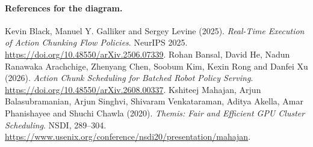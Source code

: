 \paragraph{References for the diagram.}
Kevin Black, Manuel Y. Galliker and Sergey Levine (2025). \emph{Real-Time Execution of Action Chunking Flow Policies}. NeurIPS 2025. \url{https://doi.org/10.48550/arXiv.2506.07339}.
Rohan Bansal, David He, Nadun Ranawaka Arachchige, Zhenyang Chen, Soobum Kim, Kexin Rong and Danfei Xu (2026). \emph{Action Chunk Scheduling for Batched Robot Policy Serving}. \url{https://doi.org/10.48550/arXiv.2608.00337}.
Kshiteej Mahajan, Arjun Balasubramanian, Arjun Singhvi, Shivaram Venkataraman, Aditya Akella, Amar Phanishayee and Shuchi Chawla (2020). \emph{Themis: Fair and Efficient GPU Cluster Scheduling}. NSDI, 289--304. \url{https://www.usenix.org/conference/nsdi20/presentation/mahajan}.

\clearpage
